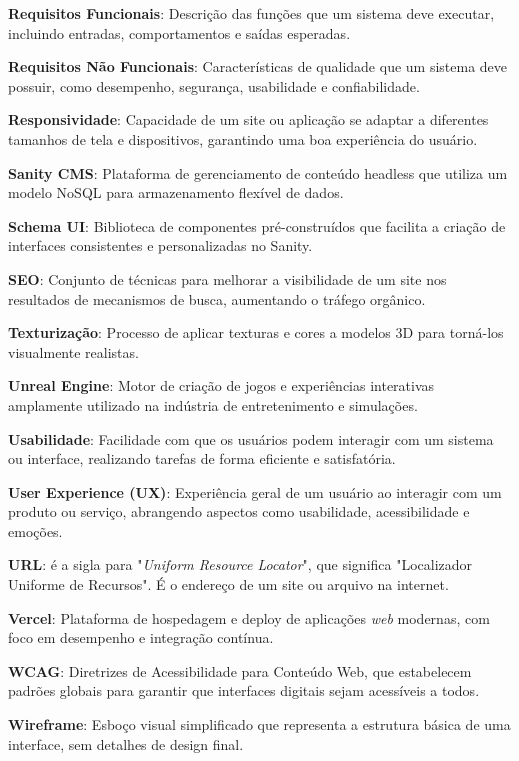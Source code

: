 \textbf{Requisitos Funcionais}: Descrição das funções que um sistema deve executar, incluindo entradas, comportamentos e saídas esperadas.

\textbf{Requisitos Não Funcionais}: Características de qualidade que um sistema deve possuir, como desempenho, segurança, usabilidade e confiabilidade.

\textbf{Responsividade}: Capacidade de um site ou aplicação se adaptar a diferentes tamanhos de tela e dispositivos, garantindo uma boa experiência do usuário.

\textbf{Sanity CMS}: Plataforma de gerenciamento de conteúdo headless que utiliza um modelo NoSQL para armazenamento flexível de dados.

\textbf{Schema UI}: Biblioteca de componentes pré-construídos que facilita a criação de interfaces consistentes e personalizadas no Sanity.

\textbf{SEO}: Conjunto de técnicas para melhorar a visibilidade de um site nos resultados de mecanismos de busca, aumentando o tráfego orgânico.

\textbf{Texturização}: Processo de aplicar texturas e cores a modelos 3D para torná-los visualmente realistas.

\textbf{Unreal Engine}: Motor de criação de jogos e experiências interativas amplamente utilizado na indústria de entretenimento e simulações.

\textbf{Usabilidade}: Facilidade com que os usuários podem interagir com um sistema ou interface, realizando tarefas de forma eficiente e satisfatória.

\textbf{User Experience (UX)}: Experiência geral de um usuário ao interagir com um produto ou serviço, abrangendo aspectos como usabilidade, acessibilidade e emoções.

\textbf{URL}: é a sigla para "\textit{Uniform Resource Locator}", que significa "Localizador Uniforme de Recursos". É o endereço de um site ou arquivo na internet.

\textbf{Vercel}: Plataforma de hospedagem e deploy de aplicações \textit{web} modernas, com foco em desempenho e integração contínua.

\textbf{WCAG}: Diretrizes de Acessibilidade para Conteúdo Web, que estabelecem padrões globais para garantir que interfaces digitais sejam acessíveis a todos.

\textbf{Wireframe}: Esboço visual simplificado que representa a estrutura básica de uma interface, sem detalhes de design final.